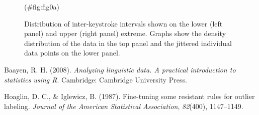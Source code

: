 \begin{appendix}
\begin{figure}[!h]
{}

\caption{\label{fig:outliers}Distribution of inter-keystroke intervals shown on the lower (left panel) and upper (right panel) extreme. Graphs show the density distribution of the data in the top panel and the jittered individual data points on the lower panel.}(\#fig:fig0a)
\end{figure}

\hypertarget{refs}{}
\leavevmode\hypertarget{ref-baa08book}{}%
Baayen, R. H. (2008). \emph{Analyzing linguistic data. A practical
introduction to statistics using R}. Cambridge: Cambridge University
Press.

\leavevmode\hypertarget{ref-hoaglin1987fine}{}%
Hoaglin, D. C., \& Iglewicz, B. (1987). Fine-tuning some resistant rules
for outlier labeling. \emph{Journal of the American Statistical
Association}, \emph{82}(400), 1147--1149.
\end{appendix}
